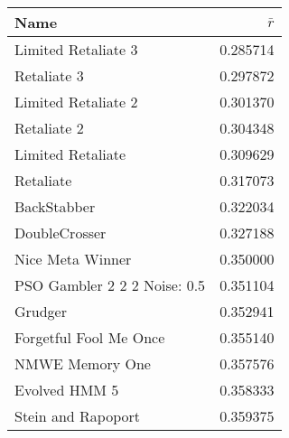 \begin{tabular}{lr}
\toprule
Name                       &              $\bar{r}$   \\
\midrule
Limited Retaliate 3        &                 0.285714 \\
Retaliate 3                &                 0.297872 \\
Limited Retaliate 2        &                 0.301370 \\
Retaliate 2                &                 0.304348 \\
Limited Retaliate          &                 0.309629 \\
Retaliate                  &                 0.317073 \\
BackStabber                &                 0.322034 \\
DoubleCrosser              &                 0.327188 \\
Nice Meta Winner           &                 0.350000 \\
PSO Gambler 2 2 2 Noise: 0.5 &                 0.351104 \\
Grudger                    &                 0.352941 \\
Forgetful Fool Me Once     &                 0.355140 \\
NMWE Memory One            &                 0.357576 \\
Evolved HMM 5              &                 0.358333 \\
Stein and Rapoport         &                 0.359375 \\
\bottomrule
\end{tabular}
